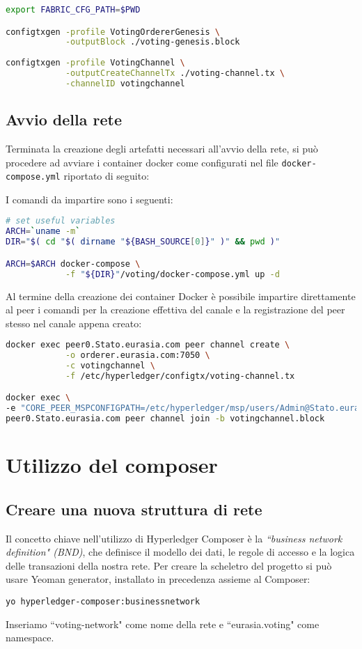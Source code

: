 \begin{lstlisting}[language=bash]
export FABRIC_CFG_PATH=$PWD

configtxgen -profile VotingOrdererGenesis \
			-outputBlock ./voting-genesis.block
			
configtxgen -profile VotingChannel \
			-outputCreateChannelTx ./voting-channel.tx \
			-channelID votingchannel
\end{lstlisting}

	\subsection{Avvio della rete}
		Terminata la creazione degli artefatti necessari all'avvio della rete, si può procedere ad avviare i container docker come configurati nel file \lstinline{docker-compose.yml} riportato di seguito:
		
		
		I comandi da impartire sono i seguenti:
		
\begin{lstlisting}[language=bash]
# set useful variables
ARCH=`uname -m`
DIR="$( cd "$( dirname "${BASH_SOURCE[0]}" )" && pwd )"

ARCH=$ARCH docker-compose \
			-f "${DIR}"/voting/docker-compose.yml up -d
\end{lstlisting}

		Al termine della creazione dei container Docker è possibile impartire direttamente al peer i comandi per la creazione effettiva del canale e la registrazione del peer stesso nel canale appena creato:

\begin{lstlisting}[language=bash]
docker exec peer0.Stato.eurasia.com peer channel create \
			-o orderer.eurasia.com:7050 \
			-c votingchannel \
			-f /etc/hyperledger/configtx/voting-channel.tx

docker exec \
-e "CORE_PEER_MSPCONFIGPATH=/etc/hyperledger/msp/users/Admin@Stato.eurasia.com/msp" \
peer0.Stato.eurasia.com peer channel join -b votingchannel.block
\end{lstlisting}
	
\section{Utilizzo del composer}
	\subsection{Creare una nuova struttura di rete}
		Il concetto chiave nell'utilizzo di Hyperledger Composer è la \emph{``business network definition" (BND)}, che definisce il modello dei dati, le regole di accesso e la logica delle transazioni della nostra rete. Per creare la scheletro del progetto si può usare Yeoman generator, installato in precedenza assieme al Composer:
\begin{lstlisting}
yo hyperledger-composer:businessnetwork
\end{lstlisting}
		Inseriamo ``voting-network" come nome della rete e ``eurasia.voting" come namespace.
